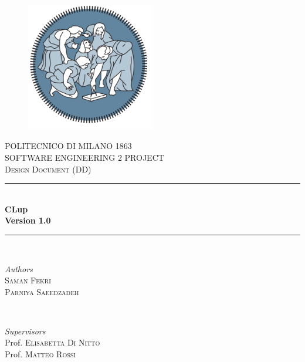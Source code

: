 \begin{titlepage}

	\center %

    \begin{figure}[H]
      \centering
      \includegraphics[width=0.5\textwidth,keepaspectratio]{images/PolimiLogo1.png}
    \end{figure}
    
	\textsc{\LARGE POLITECNICO DI MILANO 1863}\\[2cm]

	\textsc{\Large SOFTWARE ENGINEERING 2 PROJECT }\\[0.5cm]

	\textsc{\large Design Document (DD)}\\[0.5cm]
	
	\rule{\linewidth}{0.5mm}\\[0.4cm]
	{\huge\bfseries CLup}\\[0.4cm]
	\textbf{Version 1.0}\\

	\rule{\linewidth}{0.5mm}\\[1.5cm]

	\begin{minipage}{0.4\textwidth}
		\begin{flushleft}
			\large
			\textit{Authors}\\
			 \textsc{Saman Fekri} \\
			 \textsc{Parniya Saeedzadeh}
		\end{flushleft}
	\end{minipage}
	~
	\begin{minipage}{0.5\textwidth}
		\begin{flushright}
			\large
			\textit{Supervisors}\\
			Prof. \textsc {Elisabetta Di Nitto}\\
			Prof. \textsc {Matteo Rossi}
		\end{flushright}
	\end{minipage}
	

\end{titlepage}
